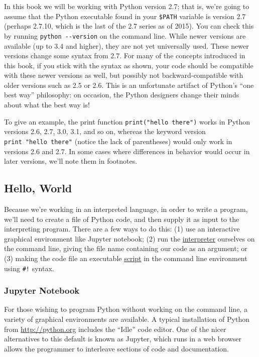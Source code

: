 \documentclass[
]{memoir}
\begin{document}
In this book we will be working with Python version 2.7; that is, we're going to assume that the Python executable found in your \texttt{\$PATH} variable is version 2.7 (perhaps 2.7.10, which is the last of the 2.7 series as of 2015). You can check this by running \texttt{python\ -\/-version} on the command line. While newer versions are available (up to 3.4 and higher), they are not yet universally used. These newer versions change some syntax from 2.7. For many of the concepts introduced in this book, if you stick with the syntax as shown, your code should be compatible with these newer versions as well, but possibly not backward-compatible with older versions such as 2.5 or 2.6. This is an unfortunate artifact of Python's \enquote{one best way} philosophy: on occasion, the Python designers change their minds about what the best way is!

To give an example, the print function \texttt{print("hello\ there")} works in Python versions 2.6, 2.7, 3.0, 3.1, and so on, whereas the keyword version \texttt{print\ "hello\ there"} (notice the lack of parentheses) would only work in versions 2.6 and 2.7. In some cases where differences in behavior would occur in later versions, we'll note them in footnotes.

\hypertarget{hello-world-1}{%
\subsection*{Hello, World}\label{hello-world-1}}

Because we're working in an interpreted language, in order to write a program, we'll need to create a file of Python code, and then supply it as input to the interpreting program. There are a few ways to do this: (1) use an interactive graphical environment like Jupyter notebook; (2) run the \protect\hyperlink{interpreter_def}{interpreter} ourselves on the command line, giving the file name containing our code as an argument; or (3) making the code file an executable \protect\hyperlink{script_def}{script} in the command line environment using \texttt{\#!} syntax.

\hypertarget{jupyter-notebook}{%
\subsubsection*{Jupyter Notebook}\label{jupyter-notebook}}

For those wishing to program Python without working on the command line, a variety of graphical environments are available. A typical installation of Python from \url{http://python.org} includes the \enquote{Idle} code editor. One of the nicer alternatives to this default is known as Jupyter, which runs in a web browser allows the programmer to interleave sections of code and documentation.
\end{document}
